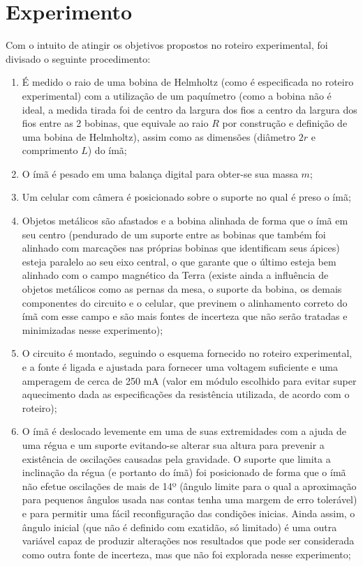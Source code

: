 \section{Experimento}
Com o intuito de atingir os objetivos propostos no roteiro experimental, foi divisado o seguinte procedimento:
\begin{enumerate}
    \item É medido o raio de uma bobina de Helmholtz (como é especificada no roteiro experimental) com a utilização de um paquímetro (como a bobina não é ideal, a medida tirada foi de centro da largura dos fios a centro da largura dos fios entre as 2 bobinas, que equivale ao raio $R$ por construção e definição de uma bobina de Helmholtz), assim como as dimensões (diâmetro $2r$ e comprimento $L$) do ímã;
    \item O ímã é pesado em uma balança digital para obter-se sua massa $m$;
    \item Um celular com câmera é posicionado sobre o suporte no qual é preso o ímã;
    \item Objetos metálicos são afastados e a bobina alinhada de forma que o ímã em seu centro (pendurado de um suporte entre as bobinas que também foi alinhado com marcações nas próprias bobinas que identificam seus ápices) esteja paralelo ao seu eixo central, o que garante que o último esteja bem alinhado com o campo magnético da Terra (existe ainda a influência de objetos metálicos como as pernas da mesa, o suporte da bobina, os demais componentes do circuito e o celular, que previnem o alinhamento correto do ímã com esse campo e são mais fontes de incerteza que não serão tratadas e minimizadas nesse experimento);
    \item O circuito é montado, seguindo o esquema fornecido no roteiro experimental, e a fonte é ligada e ajustada para fornecer uma voltagem suficiente e uma amperagem de cerca de 250 mA (valor em módulo escolhido para evitar super aquecimento dada as especificações da resistência utilizada, de acordo com o roteiro);
    \item O ímã é deslocado levemente em uma de suas extremidades com a ajuda de uma régua e um suporte evitando-se alterar sua altura para prevenir a existência de oscilações causadas pela gravidade. O suporte que limita a inclinação da régua (e portanto do ímã) foi posicionado de forma que o ímã não efetue oscilações de mais de 14º (ângulo limite para o qual a aproximação para pequenos ângulos usada nas contas tenha uma margem de erro tolerável) e para permitir uma fácil reconfiguração das condições inicias. Ainda assim, o ângulo inicial (que não é definido com exatidão, só limitado) é uma outra variável capaz de produzir alterações nos resultados que pode ser considerada como outra fonte de incerteza, mas que não foi explorada nesse experimento;

\end{enumerate}
